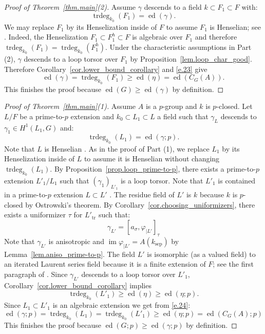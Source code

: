 \documentclass[12pt]{amsart}
\numberwithin{equation}{section}
\theoremstyle{definition}
\newcommand{\im}{\operatorname{im}}
\newcommand{\trdeg}{\operatorname{trdeg}}
\newcommand{\ed}{\operatorname{ed}}
\newcommand{\sep}{\operatorname{sep}}
\newcommand{\tr}{\operatorname{tr}}
\newcommand{\ksep}{k_{\sep}}
\newcommand{\vphi}{\varphi}
\begin{document}
\smallskip
\begin{proof}[Proof of Theorem~\ref{thm.main}(2)] Assume $\gamma$ descends to a field $k\subset F_1 \subset F$ with:  
    $$\trdeg_{k_0}(F_1) = \ed(\gamma).$$ 
    We may replace $F_1$ by its Henselization inside of $F$ to assume $F_1$ is Henselian; see \cite[Appendix A.3]{tignol2015value}. Indeed, the Henselization $F_1 \subset F_1^h \subset F$ is algebraic over $F_1$ and therefore $\trdeg_{k_0}(F_1) = \trdeg_{k_0}(F_1^h)$.
    Under the characteristic assumptions in Part (2), $\gamma$ descends to a loop torsor over $F_1$ by Proposition~\ref{lem.loop_char_good}. Therefore Corollary~\ref{cor.lower_bound_corollary} and \eqref{e.23} give  
    \begin{equation}\label{e.equation_that_fails_in_example}
        \ed(\gamma)=\trdeg_{k_0}(F_1)\geq \ed(\eta) = \ed(C_G(A)).
    \end{equation}
    This finishes the proof because $\ed(G)\geq \ed(\gamma)$ by definition.
\end{proof}
\begin{proof}[Proof of Theorem~\ref{thm.main}(1)] Assume $A$ is a $p$-group and $k$ is $p$-closed. Let $L/F$ be a prime-to-$p$ extension and $k_0\subset L_1\subset L$ a field such that  $\gamma_L$ descends to $\gamma_1 \in H^1(L_1,G)$ and:
\begin{equation}\label{e.24}
    \trdeg_{k_0}(L_1) = \ed(\gamma;p).
\end{equation}
Note that $L$ is Henselian \cite[Proposition A.30]{tignol2015value}. As in the proof of Part (1), we replace $L_1$ by its Henselization inside of $L$ to assume it is Henselian without changing $\trdeg_{k_0}(L_1)$.
By Proposition~\ref{prop.loop_prime-to-p}, there exists a prime-to-$p$ extension $L'_1/L_1$ such that $(\gamma_1)_{L'_1}$ is a loop torsor. Note that $L'_1$ is contained in a prime-to-$p$ extension $L\subset L'$ \cite[Lemma 6.1]{merkurjev2009essential}. The residue field of $L'$ is $k$ because $k$ is $p$-closed by Ostrowski's theorem.
By Corollary~\ref{cor.choosing_uniformizers}, there exists a uniformizer $\tau$ for $L'_{\tr}$ such that:
$$\gamma_{L'} = [a_\sigma, \vphi_{|L'}]_\tau$$
Note that $\gamma_{L'}$ is anisotropic and $\im\vphi_{|L'} = A(\ksep)$ by Lemma~\ref{lem.aniso_prime-to-p}. The field $L'$ is isomorphic (as a valued field) to an iterated Laurent series field because it is a finite extension of $F$; see the first paragraph of \cite[Page 199]{gille2009lower}.
Since $\gamma_{L'}$ descends to a loop torsor over $L'_1$, Corollary~\ref{cor.lower_bound_corollary} implies $$\trdeg_{k_0}(L'_1)\geq \ed(\eta) \geq \ed(\eta;p).$$
Since $L_1 \subset L'_1$ is an algebraic extension we get from \eqref{e.24}: 
$$\ed(\gamma;p) = \trdeg_{k_0}(L_1)= \trdeg_{k_0}(L'_1)\geq \ed(\eta;p) = \ed(C_G(A);p)$$
This finishes the proof because $\ed(G;p) \geq \ed(\gamma;p)$ by definition.
\end{proof}
\end{document}
